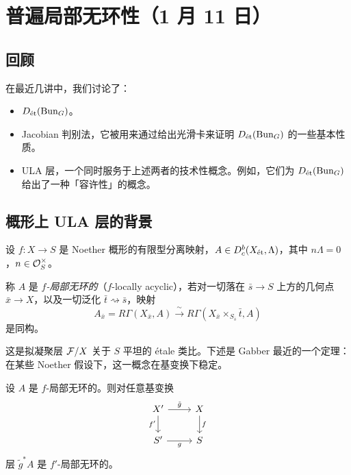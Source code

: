 \section[普遍局部无环性]{普遍局部无环性（1 月 11 日）}

\setcounter{secnumdepth}{3}


\subsection{回顾}

在最近几讲中，我们讨论了：

\begin{itemize}
\item $D_{\et}(\Bun_G)$。
\item Jacobian 判别法，它被用来通过给出光滑卡来证明 $D_{\et}(\Bun_G)$ 的一些基本性质。
\item ULA 层，一个同时服务于上述两者的技术性概念。例如，它们为 $D_{\et}(\Bun_G)$ 给出了一种「容许性」的概念。
\end{itemize}

\subsection{概形上 ULA 层的背景}

设 $f\colon X\to S$ 是 Noether 概形的有限型分离映射，$A\in D^b_c(X_{\et},\Lambda)$，其中 $n\Lambda=0$，$n\in\cO_S^\times$。

\begin{definition}
称 $A$ 是 \emph{$f$-局部无环的}（$f$-locally acyclic），若对一切落在 $\bar s\to S$ 上方的几何点 $\bar x\to X$，以及一切泛化 $\bar t\rightsquigarrow\bar s$，映射
\[
A_{\bar x}=R\Gamma(X_{\bar x},A)\xrightarrow{\ \sim\ }R\Gamma(X_{\bar x}\times_{S_{\bar s}}\bar t,A)
\]
是同构。
\end{definition}

\begin{remark}
这是拟凝聚层 $\cF/X$ 关于 $S$ 平坦的 étale 类比。下述是 Gabber 最近的一个定理：在某些 Noether 假设下，这一概念在基变换下稳定。
\end{remark}

\begin{theorem}[Gabber]
设 $A$ 是 $f$-局部无环的。则对任意基变换
\[
\begin{tikzcd}
X' \arrow[r, "\tilde g"] \arrow[d, "f'"'] & X \arrow[d, "f"] \\
S' \arrow[r, "g"'] & S
\end{tikzcd}
\]
层 $\tilde g^*A$ 是 $f'$-局部无环的。
\end{theorem}

